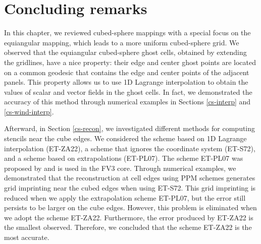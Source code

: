 \section{Concluding remarks}
\label{cs-conc}
In this chapter, we reviewed cubed-sphere mappings with a special focus on the equiangular mapping,
which leads to a more uniform cubed-sphere grid. We observed that the equiangular cubed-sphere ghost cells,
obtained by extending the gridlines, have a nice property: their edge and center ghost points are located on a common geodesic
that contains the edge and center points of the adjacent panels. 
This property allows us to use 1D Lagrange interpolation to obtain the values of scalar and vector fields in the ghost cells. 
In fact, we demonstrated the accuracy of this method through numerical examples in Sections \ref{cs-interp} and \ref{cs-wind-interp}.
 
Afterward, in Section \ref{cs-recon}, we investigated different methods for computing stencils near the cube edges.
We considered the scheme based on 1D Lagrange interpolation (ET-ZA22), a scheme that ignores the coordinate system (ET-S72),
and a scheme based on extrapolations (ET-PL07). The scheme ET-PL07 was proposed by \citet{putman:2007} and is used in the FV3 core.
Through numerical examples, we demonstrated that the reconstruction at cell edges using PPM schemes generates grid imprinting near
the cubed edges when using ET-S72. This grid imprinting is reduced when we apply the extrapolation scheme ET-PL07, 
but the error still persists to be larger on the cube edges. However, this problem is eliminated when we adopt the scheme ET-ZA22.
Furthermore, the error produced by ET-ZA22 is the smallest observed. Therefore, we concluded that the scheme ET-ZA22 is the most accurate.


